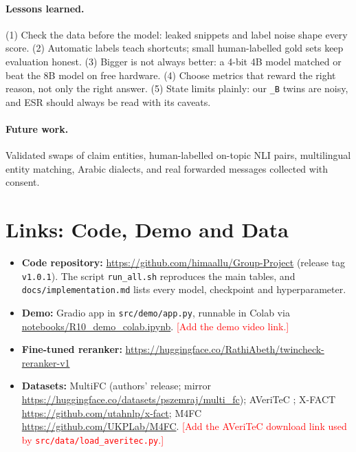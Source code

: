 \documentclass[11pt,a4paper]{article}
\newcommand{\tw}[1]{\texttt{\_#1}}          %
\begin{document}
\paragraph{Lessons learned.}
(1) Check the data before the model: leaked snippets and label noise shape every score. (2) Automatic labels teach shortcuts; small human-labelled gold sets keep evaluation honest. (3) Bigger is not always better: a 4-bit 4B model matched or beat the 8B model on free hardware. (4) Choose metrics that reward the right reason, not only the right answer. (5) State limits plainly: our \tw{B} twins are noisy, and ESR should always be read with its caveats.

\paragraph{Future work.}
Validated swaps of claim entities, human-labelled on-topic NLI pairs, multilingual entity matching, Arabic dialects, and real forwarded messages collected with consent.

\section{Links: Code, Demo and Data}
\begin{itemize}\setlength{\itemsep}{1pt}
  \item \textbf{Code repository:} \url{https://github.com/himaallu/Group-Project} (release tag \texttt{v1.0.1}). The script \texttt{run\_all.sh} reproduces the main tables, and \texttt{docs/implementation.md} lists every model, checkpoint and hyperparameter.
  \item \textbf{Demo:} Gradio app in \texttt{src/demo/app.py}, runnable in Colab via \url{notebooks/R10_demo_colab.ipynb}. \textcolor{red}{[Add the demo video link.]}
  \item \textbf{Fine-tuned reranker:} \url{https://huggingface.co/RathiAbeth/twincheck-reranker-v1}
  \item \textbf{Datasets:} MultiFC \citep{augenstein2019multifc} (authors' release; mirror \url{https://huggingface.co/datasets/pszemraj/multi_fc}); AVeriTeC \citep{schlichtkrull2023averitec}; X-FACT \url{https://github.com/utahnlp/x-fact}; M4FC \url{https://github.com/UKPLab/M4FC}. \textcolor{red}{[Add the AVeriTeC download link used by \texttt{src/data/load\_averitec.py}.]}
\end{itemize}
\end{document}
